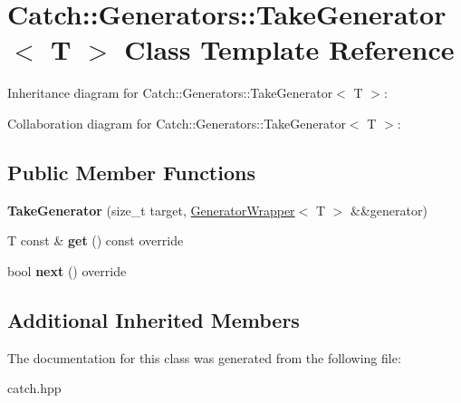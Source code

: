 \hypertarget{classCatch_1_1Generators_1_1TakeGenerator}{}\section{Catch\+:\+:Generators\+:\+:Take\+Generator$<$ T $>$ Class Template Reference}
\label{classCatch_1_1Generators_1_1TakeGenerator}


Inheritance diagram for Catch\+:\+:Generators\+:\+:Take\+Generator$<$ T $>$\+:


Collaboration diagram for Catch\+:\+:Generators\+:\+:Take\+Generator$<$ T $>$\+:
\subsection*{Public Member Functions}
\begin{DoxyCompactItemize}
\item 
\mbox{\label{classCatch_1_1Generators_1_1TakeGenerator_aacef789c01a86246249c88a184268c65}} 
{\bfseries Take\+Generator} (size\+\_\+t target, \hyperlink{classCatch_1_1Generators_1_1GeneratorWrapper}{Generator\+Wrapper}$<$ T $>$ \&\&generator)
\item 
\mbox{\label{classCatch_1_1Generators_1_1TakeGenerator_aa4d2560f2066ec2eb4a351d62c107c78}} 
T const  \& {\bfseries get} () const override
\item 
\mbox{\label{classCatch_1_1Generators_1_1TakeGenerator_ae343f3e28fe04e0a20d6fdf69bfb4c78}} 
bool {\bfseries next} () override
\end{DoxyCompactItemize}
\subsection*{Additional Inherited Members}


The documentation for this class was generated from the following file\+:\begin{DoxyCompactItemize}
\item 
catch.\+hpp\end{DoxyCompactItemize}
